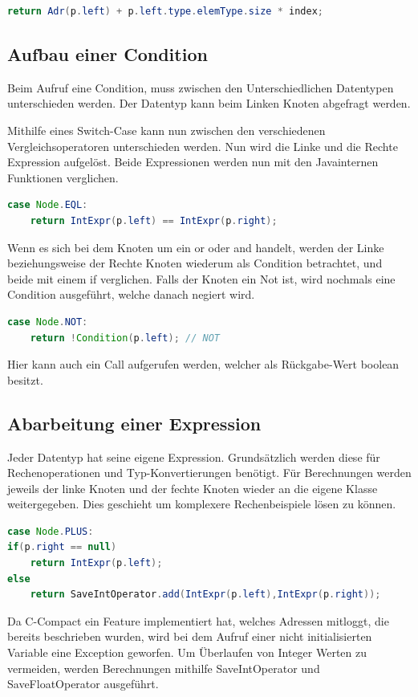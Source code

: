 \begin{lstlisting}[language=JAVA]
return Adr(p.left) + p.left.type.elemType.size * index;
\end{lstlisting}

\subsection{Aufbau einer Condition}
Beim Aufruf eine Condition, muss zwischen den Unterschiedlichen Datentypen unterschieden werden. Der Datentyp kann beim Linken Knoten abgefragt werden.

Mithilfe eines Switch-Case kann nun zwischen den verschiedenen Vergleichsoperatoren unterschieden werden. Nun wird die Linke und die Rechte Expression aufgelöst. Beide Expressionen werden nun mit den Javainternen Funktionen verglichen. 
\begin{lstlisting}[language=JAVA]
case Node.EQL:
	return IntExpr(p.left) == IntExpr(p.right);
\end{lstlisting}

Wenn es sich bei dem Knoten um ein or oder and handelt, werden der Linke beziehungsweise der Rechte Knoten wiederum als Condition betrachtet, und beide mit einem if verglichen. Falls der Knoten ein Not ist, wird nochmals eine Condition ausgeführt, welche danach negiert wird.
\begin{lstlisting}[language=JAVA]
case Node.NOT:
	return !Condition(p.left); // NOT
\end{lstlisting}

Hier kann auch ein Call aufgerufen werden, welcher als Rückgabe-Wert boolean besitzt.

\subsection{Abarbeitung einer Expression}
Jeder Datentyp hat seine eigene Expression. Grundsätzlich werden diese für Rechenoperationen und Typ-Konvertierungen benötigt. Für Berechnungen werden jeweils der linke Knoten und der fechte Knoten wieder an die eigene Klasse weitergegeben. Dies geschieht um komplexere Rechenbeispiele lösen zu können. 
\begin{lstlisting}[language=JAVA]
case Node.PLUS:
if(p.right == null)
	return IntExpr(p.left);
else
	return SaveIntOperator.add(IntExpr(p.left),IntExpr(p.right));
\end{lstlisting}

Da C-Compact ein Feature implementiert hat, welches Adressen mitloggt, die bereits beschrieben wurden, wird bei dem Aufruf einer nicht initialisierten Variable eine Exception geworfen. Um Überlaufen von Integer Werten zu vermeiden, werden Berechnungen mithilfe SaveIntOperator und SaveFloatOperator ausgeführt.

